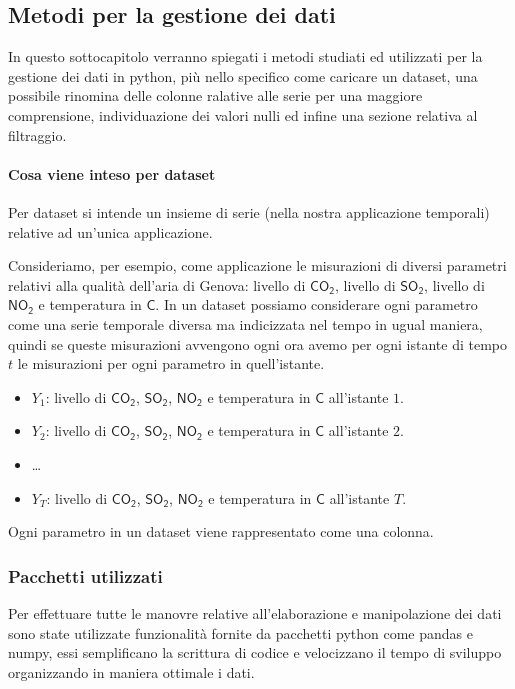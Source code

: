 \subsection{Metodi per la gestione dei dati}
In questo sottocapitolo verranno spiegati i metodi studiati ed utilizzati per la gestione dei
dati in python, più nello specifico come caricare un dataset, una possibile rinomina delle
colonne ralative alle serie per una maggiore comprensione, individuazione dei valori
nulli ed infine una sezione relativa al filtraggio.\\

\paragraph{Cosa viene inteso per dataset} Per dataset si intende un insieme di
serie (nella nostra applicazione temporali) relative ad un'unica applicazione.

\begin{esempio}
    Consideriamo, per esempio, come applicazione le misurazioni di diversi parametri
    relativi alla qualità dell'aria di Genova: livello di $\mathsf{CO_2}$,
    livello di $\mathsf{SO_2}$, livello di $\mathsf{NO_2}$ e temperatura in \textdegree$\mathsf{C}$.
    In un dataset possiamo considerare ogni parametro come una serie temporale diversa ma indicizzata
    nel tempo in ugual maniera, quindi se queste misurazioni avvengono ogni ora avemo
    per ogni istante di tempo $t$ le misurazioni per ogni parametro in quell'istante.
    \begin{itemize}
        \setlength\itemsep{-0.5em}
        \item $Y_1$: livello di $\mathsf{CO_2}$, $\mathsf{SO_2}$, $\mathsf{NO_2}$ e temperatura in \textdegree$\mathsf{C}$ all'istante $1$.
        \item $Y_2$: livello di $\mathsf{CO_2}$, $\mathsf{SO_2}$, $\mathsf{NO_2}$ e temperatura in \textdegree$\mathsf{C}$ all'istante $2$.
        \item \dots
        \item $Y_T$: livello di $\mathsf{CO_2}$, $\mathsf{SO_2}$, $\mathsf{NO_2}$ e temperatura in \textdegree$\mathsf{C}$ all'istante $T$.
    \end{itemize}
    Ogni parametro in un dataset viene rappresentato come una colonna.
\end{esempio}

\subsubsection{Pacchetti utilizzati}
Per effettuare tutte le manovre relative all'elaborazione e manipolazione dei dati sono state
utilizzate funzionalità fornite da pacchetti python come pandas e numpy, essi semplificano
la scrittura di codice e velocizzano il tempo di sviluppo organizzando in maniera ottimale
i dati.


